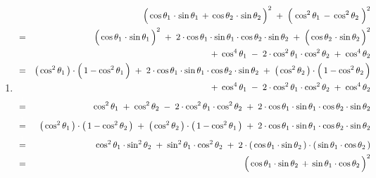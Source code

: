 \begin{enumerate}
\item
	\begin{eqnarray*}
	&&
		\left(\,
			\cos\theta_{1}\overset{{\color{white}1}}{\cdot}\sin\theta_{1}
			\, + \,
			\cos\theta_{2}\overset{{\color{white}1}}{\cdot}\sin\theta_{2}
			\,\right)^{2}
		\; + \;
		\left(\; \cos^{2}\theta_{1} \, \overset{{\color{white}.}}{-} \, \cos^{2}\theta_{2} \;\right)^{2}
	\\
	& = &
		\left(\, \cos\theta_{1}\overset{{\color{white}1}}{\cdot}\sin\theta_{1} \,\right)^{2}
		\; + \;
		2 \cdot \cos\theta_{1} \cdot \sin\theta_{1} \cdot \cos\theta_{2} \cdot \sin\theta_{2}
		\; + \;
		\left(\, \cos\theta_{2}\overset{{\color{white}1}}{\cdot}\sin\theta_{2} \,\right)^{2}
	\\
	& &
		\; + \;
		\cos^{4}\theta_{1}
		\; - \;
		2 \cdot \cos^{2}\theta_{1} \cdot \cos^{2}\theta_{2}
		\; + \;
		\cos^{4}\theta_{2}
	\\
	& = &
		\left(\, \cos^{2}\theta_{1} \,\right)
		\cdot
		\left(\, 1\overset{{\color{white}.}}{-}\cos^{2}\theta_{1} \,\right)
		\; + \;
		2 \cdot \cos\theta_{1} \cdot \sin\theta_{1} \cdot \cos\theta_{2} \cdot \sin\theta_{2}
		\; + \;
		\left(\, \cos^{2}\theta_{2} \,\right)
		\cdot
		\left(\, 1\overset{{\color{white}.}}{-}\cos^{2}\theta_{2} \,\right)
	\\
	& &
		\; + \;
		\cos^{4}\theta_{1}
		\; - \;
		2 \cdot \cos^{2}\theta_{1} \cdot \cos^{2}\theta_{2}
		\; + \;
		\cos^{4}\theta_{2}
	\\
	& \overset{{\color{white}\textnormal{\large1}}}{=} &
		\cos^{2}\theta_{1}
		\; + \;
		\cos^{2}\theta_{2}
		\; - \;
		2 \cdot \cos^{2}\theta_{1} \cdot \cos^{2}\theta_{2}
		\; + \;
		2 \cdot \cos\theta_{1} \cdot \sin\theta_{1} \cdot \cos\theta_{2} \cdot \sin\theta_{2}
	\\
	& \overset{{\color{white}\textnormal{\large1}}}{=} &
		\left(\,\cos^{2}\theta_{1}\,\right) \cdot \left(\,1 - \cos^{2}\theta_{2}\,\right)
		\; + \;
		\left(\,\cos^{2}\theta_{2}\,\right) \cdot \left(\,1 - \cos^{2}\theta_{1}\,\right)
		\; + \;
		2 \cdot \cos\theta_{1} \cdot \sin\theta_{1} \cdot \cos\theta_{2} \cdot \sin\theta_{2}
	\\
	& \overset{{\color{white}\textnormal{\large1}}}{=} &
		\cos^{2}\theta_{1} \cdot \sin^{2}\theta_{2}
		\; + \;
		\sin^{2}\theta_{1} \cdot \cos^{2}\theta_{2}
		\; + \;
		2 \cdot \left(\,\cos\theta_{1} \cdot \sin\theta_{2} \,\right) \cdot \left(\,\sin\theta_{1} \cdot \cos\theta_{2} \,\right)
	\\
	& = &
		\left(\,\cos\theta_{1} \cdot \sin\theta_{2} \,\overset{{\color{white}.}}{+}\, \sin\theta_{1} \cdot \cos\theta_{2} \,\right)^{2}

\end{eqnarray*}
\end{enumerate}
